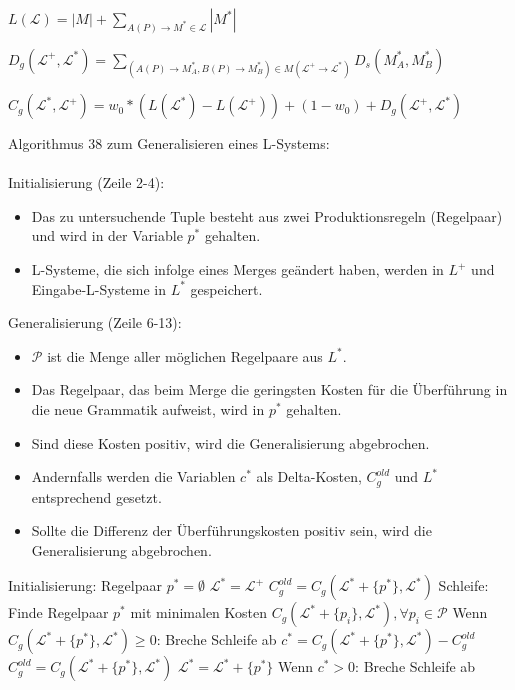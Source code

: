 \begin{algorithm}[caption={Längenfunktion $L$ für Grammatiken}]
$L(\mathcal{L}) = |M| + \sum\limits_{A(P) \rightarrow M^* \in \mathcal{L}} |M^*|$
\end{algorithm}

\begin{algorithm}[caption={Grammar Edit Distance}]
$D_g(\mathcal{L}^+, \mathcal{L}^*)= \sum\limits_{(A(P) \rightarrow M^*_A , B(P) \rightarrow M^*_B) \in M(\mathcal{L^+} \rightarrow \mathcal{L^*})} D_s(M^*_A, M^*_B)$
\end{algorithm}

\begin{algorithm}[caption={Kostenfunktion $C_g$ mit Gewichtung $w_0$}]
$C_g(\mathcal{L}^*, \mathcal{L}^+) = w_0 * (L(\mathcal{L}^*) - L(\mathcal{L}^+)) + (1 - w_0) + D_g(\mathcal{L}^+, \mathcal{L}^*)$
\end{algorithm}

\newpage

Algorithmus 38 zum Generalisieren eines L-Systems:\\~\\
Initialisierung (Zeile 2-4):
\begin{itemize}
    \item Das zu untersuchende Tuple besteht aus zwei Produktionsregeln (Regelpaar) und wird in der Variable $p^*$ gehalten.
    \item L-Systeme, die sich infolge eines Merges geändert haben, werden in $L^+$ und Eingabe-L-Systeme in $L^*$ gespeichert.
\end{itemize}
Generalisierung (Zeile 6-13):
\begin{itemize}
    \item $\mathcal{P}$ ist die Menge aller möglichen Regelpaare aus $L^*$.
    \item Das Regelpaar, das beim Merge die geringsten Kosten für die Überführung in die neue Grammatik aufweist, wird in
    $p^*$ gehalten.
    \item Sind diese Kosten positiv, wird die Generalisierung abgebrochen.
    \item Andernfalls werden die Variablen $c^*$ als Delta-Kosten, $C^{old}_g$ und $L^*$ entsprechend gesetzt.
    \item Sollte die Differenz der Überführungskosten positiv sein, wird die Generalisierung abgebrochen.
\end{itemize}

\begin{algorithm}[caption={Generalisieren eines L-Systems mit Gewichtung $w_0$}]
Initialisierung:
    Regelpaar $p^* = \emptyset$
    $\mathcal{L}^* = \mathcal{L}^+$
    $C_g^{old} = C_g(\mathcal{L}^* + \{p^*\}, \mathcal{L}^*)$
Schleife:
    Finde Regelpaar $p^*$ mit minimalen Kosten $C_g(\mathcal{L}^* + \{p_i\}, \mathcal{L}^*), \forall p_i \in \mathcal{P}$
    Wenn $C_g(\mathcal{L}^* + \{p^*\}, \mathcal{L}^*) \geq 0$:
        Breche Schleife ab
    $c^* = C_g(\mathcal{L}^* + \{p^*\}, \mathcal{L}^*) - C_g^{old}$
    $C_g^{old} = C_g(\mathcal{L}^* + \{p^*\}, \mathcal{L}^*)$
    $\mathcal{L}^* = \mathcal{L}^* + \{p^*\}$
    Wenn $c^* > 0$:
        Breche Schleife ab
\end{algorithm}

